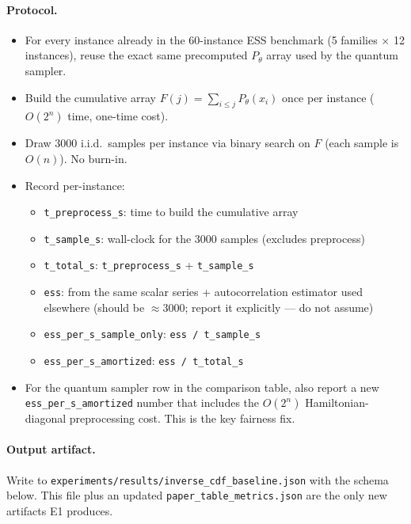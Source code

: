 \paragraph{Protocol.}
\begin{itemize}[leftmargin=*]
  \item For every instance already in the 60-instance ESS benchmark
        (5 families $\times$ 12 instances), reuse the exact same
        precomputed $P_\theta$ array used by the quantum sampler.
  \item Build the cumulative array $F(j) = \sum_{i \le j} P_\theta(x_i)$
        once per instance ($O(2^n)$ time, one-time cost).
  \item Draw 3000 i.i.d.\ samples per instance via binary search on $F$
        (each sample is $O(n)$).  No burn-in.
  \item Record per-instance:
        \begin{itemize}
          \item \verb|t_preprocess_s|: time to build the cumulative array
          \item \verb|t_sample_s|: wall-clock for the 3000 samples (excludes preprocess)
          \item \verb|t_total_s|: \verb|t_preprocess_s| + \verb|t_sample_s|
          \item \verb|ess|: from the same scalar series + autocorrelation estimator used elsewhere
                (should be $\approx 3000$; report it explicitly --- do not assume)
          \item \verb|ess_per_s_sample_only|: \verb|ess / t_sample_s|
          \item \verb|ess_per_s_amortized|: \verb|ess / t_total_s|
        \end{itemize}
  \item For the quantum sampler row in the comparison table, also report a
        new \verb|ess_per_s_amortized| number that includes the
        $O(2^n)$ Hamiltonian-diagonal preprocessing cost.  This is the
        key fairness fix.
\end{itemize}

\paragraph{Output artifact.}  Write to
\verb|experiments/results/inverse_cdf_baseline.json| with the schema below.
This file plus an updated \verb|paper_table_metrics.json| are the only new
artifacts E1 produces.

